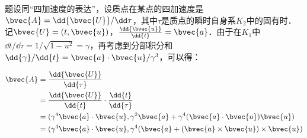 题设同“四加速度的表达”，设质点在某点的四加速度是$\bvec{A}=\dd{\bvec{U}}/\dd\tau$，其中$\tau$是质点的瞬时自身系$K_2$中的固有时．记$\bvec{U}=(t, \bvec{u})$，$\frac{\dd{\bvec{u}}}{\dd{t}}=\bvec{a}$．由于在$K_1$中$\dd{t}/\dd{\tau}=1/\sqrt{1-u^2}=\gamma$，再考虑到分部积分和$\dd{\gamma}/\dd{t}=\bvec{a}\cdot\bvec{u}/\gamma^3$，可以得：

\begin{equation}
\begin{aligned}
%
\bvec{A}&=\frac{\dd{\bvec{U}}}{\dd{\tau}}\\&=\frac{\dd{\bvec{U}}}{\dd{t}}\cdot\frac{\dd{t}}{\dd{\tau}}\\&=(\gamma^4\bvec{a}\cdot\bvec{u}, \gamma^2\bvec{a}+\gamma^4(\bvec{a}\cdot\bvec{u})\bvec{u})\\&=(\gamma^4\bvec{a}\cdot\bvec{u}, \gamma^4(\bvec{a}+(\bvec{a}\times\bvec{u})\times\bvec{u})
%
\end{aligned}
\end{equation}




